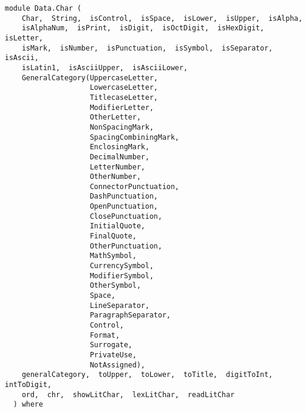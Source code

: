 \label{module:Data.Char}
\haddockbeginheader
{\haddockverb\begin{verbatim}
module Data.Char (
    Char,  String,  isControl,  isSpace,  isLower,  isUpper,  isAlpha, 
    isAlphaNum,  isPrint,  isDigit,  isOctDigit,  isHexDigit,  isLetter, 
    isMark,  isNumber,  isPunctuation,  isSymbol,  isSeparator,  isAscii, 
    isLatin1,  isAsciiUpper,  isAsciiLower, 
    GeneralCategory(UppercaseLetter,
                    LowercaseLetter,
                    TitlecaseLetter,
                    ModifierLetter,
                    OtherLetter,
                    NonSpacingMark,
                    SpacingCombiningMark,
                    EnclosingMark,
                    DecimalNumber,
                    LetterNumber,
                    OtherNumber,
                    ConnectorPunctuation,
                    DashPunctuation,
                    OpenPunctuation,
                    ClosePunctuation,
                    InitialQuote,
                    FinalQuote,
                    OtherPunctuation,
                    MathSymbol,
                    CurrencySymbol,
                    ModifierSymbol,
                    OtherSymbol,
                    Space,
                    LineSeparator,
                    ParagraphSeparator,
                    Control,
                    Format,
                    Surrogate,
                    PrivateUse,
                    NotAssigned), 
    generalCategory,  toUpper,  toLower,  toTitle,  digitToInt,  intToDigit, 
    ord,  chr,  showLitChar,  lexLitChar,  readLitChar
  ) where\end{verbatim}}
\haddockendheader

